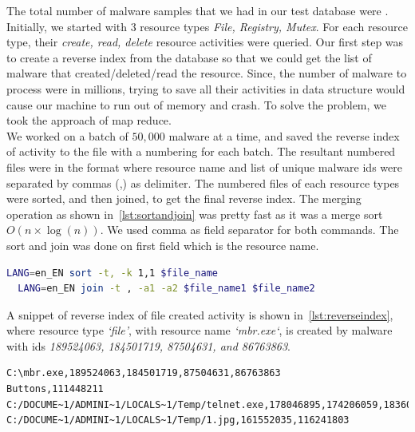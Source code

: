 The total number of malware samples that we had in our test database were \textbf{\gettotalmalwarei{}}.\\
Initially, we started with 3 resource types \textit{File, Registry, Mutex}.
For each resource type, their \textit{create, read, delete} resource activities were queried.
Our first step was to create a reverse index from the database so that we could get the list of malware that created/deleted/read the resource.
Since, the number of malware to process were in millions, trying to save all their activities in data structure would cause our machine to run out of memory and crash.
To solve the problem, we took the approach of map reduce.\\
We worked on a batch of $50,000$ malware at a time, and saved the reverse index of activity to the file with a numbering for each batch.
The resultant numbered files were in the format where resource name and list of unique malware ids were separated by commas (,) as delimiter.
The numbered files of each resource types were sorted, and then joined, to get the final reverse index.
The merging operation as shown in~\autoref{lst:sortandjoin} was pretty fast as it was a merge sort $O( n \times \log(n))$.
We used comma as field separator for both commands. The sort and join was done on first field which is the resource name.
\begin{lstlisting}[numbers=none,language=bash,caption={Sort and join the reverse index},label={lst:sortandjoin}]
  LANG=en_EN sort -t, -k 1,1 $file_name
  LANG=en_EN join -t , -a1 -a2 $file_name1 $file_name2
\end{lstlisting}
A snippet of reverse index of file created activity is shown in~\autoref{lst:reverseindex}, where resource type \emph{`file'}, with resource name \emph{`mbr.exe`}, is created by malware with ids \emph{189524063, 184501719, 87504631, and 86763863}.
\begin{lstlisting}[numbers=none,caption={Sample of reverse index created for File activity},label={lst:reverseindex}]
C:\mbr.exe,189524063,184501719,87504631,86763863
Buttons,111448211
C:/DOCUME~1/ADMINI~1/LOCALS~1/Temp/telnet.exe,178046895,174206059,183601891,89650247
C:/DOCUME~1/ADMINI~1/LOCALS~1/Temp/1.jpg,161552035,116241803
\end{lstlisting}

